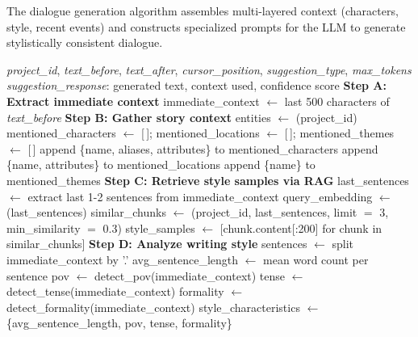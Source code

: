 The dialogue generation algorithm assembles multi-layered context (characters, style, recent events) and constructs specialized prompts for the LLM to generate stylistically consistent dialogue.

\begin{algorithm}[H]
\caption{GenerateDialogueSuggestion}
\small\begin{algorithmic}[1]
\Require \textit{project\_id}, \textit{text\_before}, \textit{text\_after}, \textit{cursor\_position}, \textit{suggestion\_type}, \textit{max\_tokens}
\Ensure \textit{suggestion\_response}: generated text, context used, confidence score
\State \textbf{Step A: Extract immediate context}
\State immediate\_context $\leftarrow$ last 500 characters of \textit{text\_before}
\State \textbf{Step B: Gather story context}
\State entities $\leftarrow$ \texttt{}(project\_id)
\State mentioned\_characters $\leftarrow$ [\,];\; mentioned\_locations $\leftarrow$ [\,];\; mentioned\_themes $\leftarrow$ [\,]
            \State append \{name, aliases, attributes\} to mentioned\_characters
            \State append \{name, attributes\} to mentioned\_locations
            \State append \{name\} to mentioned\_themes
        \EndIf
    \EndIf
\EndFor
\State \textbf{Step C: Retrieve style samples via RAG}
\State last\_sentences $\leftarrow$ extract last 1-2 sentences from immediate\_context
    \State query\_embedding $\leftarrow$ \texttt{}(last\_sentences)
    \State similar\_chunks $\leftarrow$ \texttt{}(project\_id,
    \Statex \hspace{4em} last\_sentences, limit $=$ 3, min\_similarity $=$ 0.3)
    \State style\_samples $\leftarrow$ [chunk.content[:200] for chunk in similar\_chunks]
\EndIf
\State \textbf{Step D: Analyze writing style}
\State sentences $\leftarrow$ split immediate\_context by '.'
\State avg\_sentence\_length $\leftarrow$ mean word count per sentence
\State pov $\leftarrow$ detect\_pov(immediate\_context) 
\State tense $\leftarrow$ detect\_tense(immediate\_context) 
\State formality $\leftarrow$ detect\_formality(immediate\_context) 
\State style\_characteristics $\leftarrow$ \{avg\_sentence\_length, pov, tense, formality\}

\end{algorithmic}
\end{algorithm}

